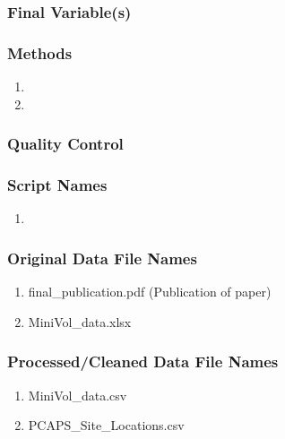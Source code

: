 \subsubsection*{Final Variable(s)}

\subsubsection*{Methods}

\begin{enumerate}
\item 
\item
\end{enumerate}

\subsubsection*{Quality Control}

\subsubsection*{Script Names}

\begin{enumerate}
\item 
\end{enumerate}

\subsubsection*{Original Data File Names}

\begin{enumerate}
\item final\_publication.pdf (Publication of paper)

\item MiniVol\_data.xlsx

\end{enumerate}

\subsubsection*{Processed/Cleaned Data File Names}

\begin{enumerate}
\item MiniVol\_data.csv
\item PCAPS\_Site\_Locations.csv
\end{enumerate}